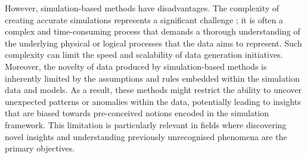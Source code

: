 \documentclass[preprint,12pt]{elsarticle}
\begin{document}
\par
However, simulation-based methods have disadvantages.
The complexity of creating accurate simulations represents a significant challenge \citep{demelo2022nextgeneration}; it is often a complex and time-consuming process that demands a thorough understanding of the underlying physical or logical processes that the data aims to represent. 
Such complexity can limit the speed and scalability of data generation initiatives.
Moreover, the novelty of data produced by simulation-based methods is inherently limited by the assumptions and rules embedded within the simulation data and models. 
As a result, these methods might restrict the ability to uncover unexpected patterns or anomalies within the data, potentially leading to insights that are biased towards pre-conceived notions encoded in the simulation framework. 
This limitation is particularly relevant in fields where discovering novel insights and understanding previously unrecognised phenomena are the primary objectives.


\end{document}
